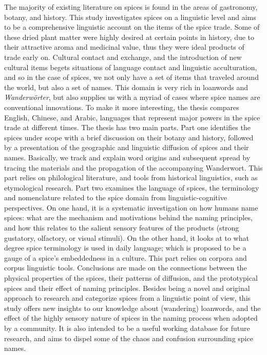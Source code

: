 The majority of existing literature on spices is found in the areas of gastronomy, botany, and history. This study investigates spices on a linguistic level and aims to be a comprehensive linguistic account on the items of the spice trade. Some of these dried plant matter were highly desired at certain points in history, due to their attractive aroma and medicinal value, thus they were ideal products of trade early on. Cultural contact and exchange, and the introduction of new cultural items begets situations of language contact and linguistic acculturation, and so in the case of spices, we not only have a set of items that traveled around the world, but also a set of names. This domain is very rich in loanwords and \textit{Wanderwörter}, but also supplies us with a myriad of cases where spice names are conventional innovations. To make it more interesting, the thesis compares English, Chinese, and Arabic, languages that represent major powers in the spice trade at different times. The thesis has two main parts. 
Part one identifies the spices under scope with a brief discussion on their botany and history, followed by a presentation of the geographic and linguistic diffusion of spices and their names. Basically, we track and explain word origins and subsequent spread by tracing the materials and the propagation of the accompanying Wanderwort. This part relies on philological literature, and tools from historical linguistics, such as etymological research.
Part two examines the language of spices, the terminology and nomenclature related to the spice domain from linguistic-cognitive perspectives. On one hand, it is a systematic investigation on how humans name spices: what are the mechanism and motivations behind the naming principles, and how this relates to the salient sensory features of the products (strong gustatory, olfactory, or visual stimuli). On the other hand, it looks at to what degree spice terminology is used in daily language; which is proposed to be a gauge of a spice’s embeddedness in a culture. This part relies on corpora and corpus linguistic tools.
Conclusions are made on the connections between the physical properties of the spices, their patterns of diffusion, and the prototypical spices and their effect of naming principles. 
Besides being a novel and original approach to research and categorize spices from a linguistic point of view, this study offers new insights to our knowledge about (wandering) loanwords, and the effect of the highly sensory nature of spices in the naming process when adopted by a community. It is also intended to be a useful working database for future research, and aims to dispel some of the chaos and confusion surrounding spice names.

\relax
{}\relax